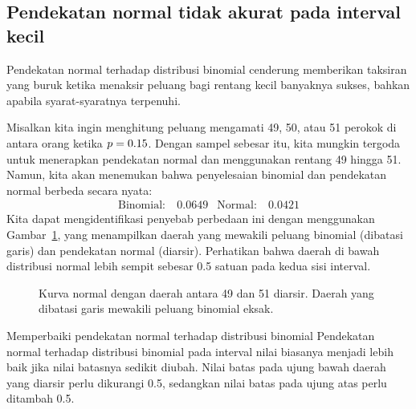 \newpage


\subsection{Pendekatan normal tidak akurat pada interval kecil}

Pendekatan normal terhadap distribusi binomial cenderung memberikan
taksiran yang buruk ketika menaksir peluang bagi rentang kecil banyaknya
sukses, bahkan apabila syarat-syaratnya terpenuhi.

\newcommand{\smokeA}{49}
\newcommand{\smokeB}{50}
\newcommand{\smokeC}{51}
\newcommand{\smokeABCBinom}{0.0649}
\newcommand{\smokeABCNormal}{0.0421}
\newcommand{\smokeABCNormalFixed}{0.0633}

Misalkan kita ingin menghitung peluang mengamati \smokeA{}, \smokeB{},
atau \smokeC{} perokok di antara \smoken{} orang ketika
$p=0.15{}$. Dengan sampel sebesar itu, kita mungkin tergoda untuk
menerapkan pendekatan normal dan menggunakan rentang \smokeA{} hingga
\smokeC{}. Namun, kita akan menemukan bahwa penyelesaian binomial dan
pendekatan normal berbeda secara nyata:
\begin{align*}
\text{Binomial:}&\ \smokeABCBinom{}
&\text{Normal:}&\ \smokeABCNormal{}
\end{align*}
Kita dapat mengidentifikasi penyebab perbedaan ini dengan menggunakan
Gambar~\ref{normApproxToBinomFail}, yang menampilkan daerah yang mewakili
peluang binomial (dibatasi garis) dan pendekatan normal (diarsir).
Perhatikan bahwa daerah di bawah distribusi normal lebih sempit sebesar
0.5 satuan pada kedua sisi interval.

\begin{figure}[h]
  \centering
  \caption{Kurva normal dengan daerah antara \smokeA{} dan \smokeC{}
      diarsir. Daerah yang dibatasi garis mewakili peluang binomial eksak.}
  \label{normApproxToBinomFail}
\end{figure}

\begin{onebox}{Memperbaiki pendekatan normal terhadap distribusi binomial}
  Pendekatan normal terhadap distribusi binomial pada interval nilai biasanya
  menjadi lebih baik jika nilai batasnya sedikit diubah. Nilai batas pada
  ujung bawah daerah yang diarsir perlu dikurangi 0.5, sedangkan nilai
  batas pada ujung atas perlu ditambah 0.5.
\end{onebox}

